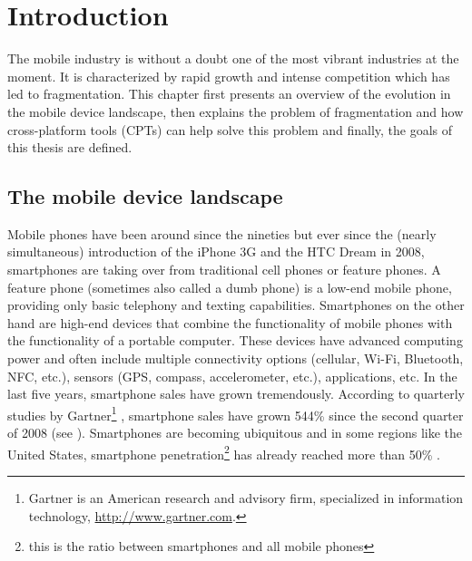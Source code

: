 \chapter{Introduction}
\label{cha:intro}

The mobile industry is without a doubt one of the most vibrant industries at the moment. It is characterized by rapid growth and intense competition which has led to fragmentation. This chapter first presents an overview of the evolution in the mobile device landscape, then explains the problem of fragmentation and how cross-platform tools (CPTs) can help solve this problem and finally, the goals of this thesis are defined.

\section{The mobile device landscape}

Mobile phones have been around since the nineties but ever since the (nearly simultaneous) introduction of the iPhone 3G and the HTC Dream in 2008, smartphones are taking over from traditional cell phones or feature phones. A feature phone (sometimes also called a dumb phone) is a low-end mobile phone, providing only basic telephony and texting capabilities. Smartphones on the other hand are high-end devices that combine the functionality of mobile phones with the functionality of a portable computer. These devices have advanced computing power and often include multiple connectivity options (cellular, Wi-Fi, Bluetooth, NFC, etc.), sensors (GPS, compass, accelerometer, etc.), applications, etc. In the last five years, smartphone sales have grown tremendously. According to quarterly studies by Gartner\footnote{Gartner is an American research and advisory firm, specialized in information technology, \url{http://www.gartner.com}.} \citeGartner, smartphone sales have grown 544\% since the second quarter of 2008 (see ). Smartphones are becoming ubiquitous and in some regions like the United States, smartphone penetration\footnote{this is the ratio between smartphones and all mobile phones} has already reached more than 50\% \cite{Nielsen:2012}. 

